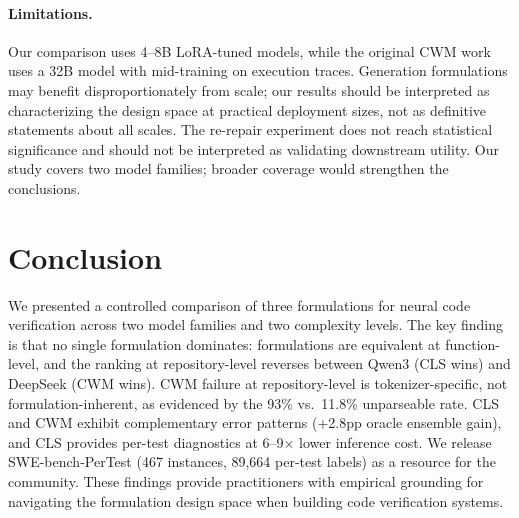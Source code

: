 \documentclass[11pt,a4paper]{article}
\begin{document}
\paragraph{Limitations.}
Our comparison uses 4--8B LoRA-tuned models, while the original CWM work \citep{gu2024cwm} uses a 32B model with mid-training on execution traces.
Generation formulations may benefit disproportionately from scale; our results should be interpreted as characterizing the design space at practical deployment sizes, not as definitive statements about all scales.
The re-repair experiment does not reach statistical significance and should not be interpreted as validating downstream utility.
Our study covers two model families; broader coverage would strengthen the conclusions.

\section{Conclusion}
\label{sec:conclusion}

We presented a controlled comparison of three formulations for neural code verification across two model families and two complexity levels.
The key finding is that no single formulation dominates: formulations are equivalent at function-level, and the ranking at repository-level reverses between Qwen3 (CLS wins) and DeepSeek (CWM wins).
CWM failure at repository-level is tokenizer-specific, not formulation-inherent, as evidenced by the 93\% vs.\ 11.8\% unparseable rate.
CLS and CWM exhibit complementary error patterns (+2.8pp oracle ensemble gain), and CLS provides per-test diagnostics at 6--9$\times$ lower inference cost.
We release SWE-bench-PerTest (467 instances, 89,664 per-test labels) as a resource for the community.
These findings provide practitioners with empirical grounding for navigating the formulation design space when building code verification systems.


\end{document}
